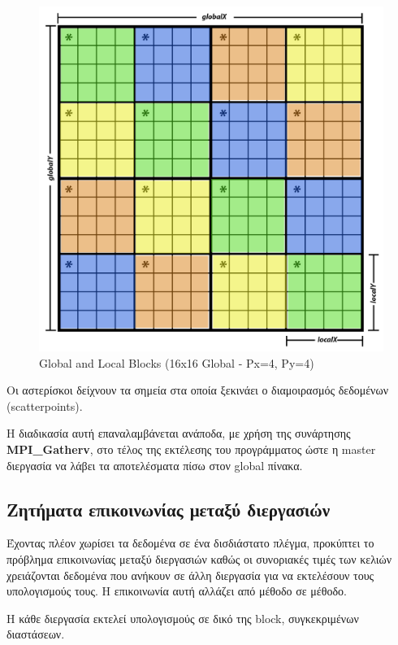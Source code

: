 \documentclass[../final_report.tex]{subfiles}
\begin{document}
\begin{figure}[H]
    \centering
    \includegraphics[scale=0.20]{global_block_scatter.png}
    \caption{Global and Local Blocks (16x16 Global - Px=4, Py=4)}
    \label{fig:Global and Local Blocks}
\end{figure}

Οι αστερίσκοι δείχνουν τα σημεία στα οποία ξεκινάει ο διαμοιρασμός δεδομένων (scatterpoints).

Η διαδικασία αυτή επαναλαμβάνεται ανάποδα, με χρήση της συνάρτησης \textbf{MPI\_Gatherv}, στο τέλος της εκτέλεσης του προγράμματος ώστε η master διεργασία
να λάβει τα αποτελέσματα πίσω στον global πίνακα.

\subsection{Ζητήματα επικοινωνίας μεταξύ διεργασιών}

Έχοντας πλέον χωρίσει τα δεδομένα σε ένα δισδιάστατο πλέγμα, προκύπτει το πρόβλημα επικοινωνίας μεταξύ διεργασιών καθώς οι συνοριακές τιμές των κελιών
χρειάζονται δεδομένα που ανήκουν σε άλλη διεργασία για να εκτελέσουν τους υπολογισμούς τους. Η επικοινωνία αυτή αλλάζει από μέθοδο σε μέθοδο.

Η κάθε διεργασία εκτελεί υπολογισμούς σε δικό της block, συγκεκριμένων διαστάσεων. 
\end{document}
